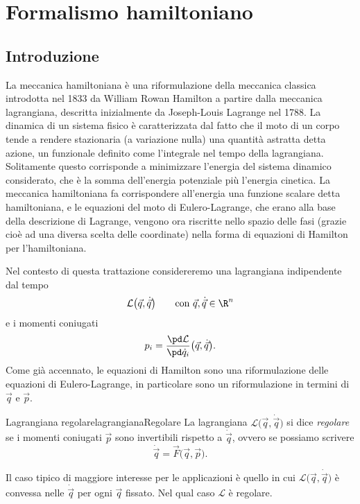 \chapter{Formalismo hamiltoniano}
%
%
\section{Introduzione}

La meccanica hamiltoniana è una riformulazione della meccanica classica introdotta nel 1833 da William Rowan Hamilton a partire dalla meccanica lagrangiana, descritta inizialmente da Joseph-Louis Lagrange nel 1788.
La dinamica di un sistema fisico è caratterizzata dal fatto che il moto di un corpo tende a rendere stazionaria (a variazione nulla) una quantità astratta detta azione, un funzionale definito come l'integrale nel tempo della lagrangiana. Solitamente questo corrisponde a minimizzare l'energia del sistema dinamico considerato, che è la somma dell'energia potenziale più l'energia cinetica.
La meccanica hamiltoniana fa corrispondere all'energia una funzione scalare detta hamiltoniana, e le equazioni del moto di Eulero-Lagrange, che erano alla base della descrizione di Lagrange, vengono ora riscritte nello spazio delle fasi (grazie cioè ad una diversa scelta delle coordinate) nella forma di equazioni di Hamilton per l'hamiltoniana.

Nel contesto di questa trattazione considereremo una lagrangiana indipendente dal tempo
\[
	\mathcal{L}\big(\vec{q},\dot{\vec{q}}\big) \qquad\text{con }\vec{q},\dot{\vec{q}}\in\R^n
\]
e i momenti coniugati
\[
	p_i = \frac{\pd\mathcal{L}}{\pd \dot{q}_i}\big(\vec{q},\dot{\vec{q}}\big).
\]
Come già accennato, le equazioni di Hamilton sono una riformulazione delle equazioni di Eulero-Lagrange, in particolare sono un riformulazione in termini di \(\vec{q}\) e \(\vec{p}\).

\begin{defn}{Lagrangiana regolare}{lagrangianaRegolare}
	La lagrangiana \(\mathcal{L}\big(\vec{q},\dot{\vec{q}}\big)\) si dice \emph{regolare} se i momenti coniugati \(\vec{p}\) sono invertibili rispetto a \(\dot{\vec{q}}\), ovvero se possiamo scrivere
	\[
		\dot{\vec{q}} = \vec{F}\big(\vec{q}, \vec{p}\big).
	\]
\end{defn}

\begin{oss}
	Il caso tipico di maggiore interesse per le applicazioni è quello in cui \(\mathcal{L}\big(\vec{q},\dot{\vec{q}}\big)\) è convessa nelle \(\dot{\vec{q}}\) per ogni \(\vec{q}\) fissato. Nel qual caso \(\mathcal{L}\) è regolare.
\end{oss}

